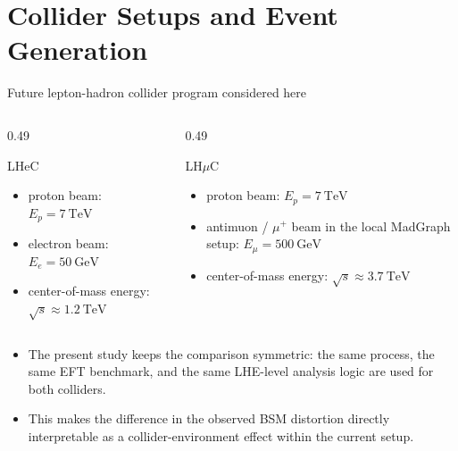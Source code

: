 \documentclass[aspectratio=1610,english]{beamer}
\begin{document}
\section{Collider Setups and Event Generation}



\begin{frame}{Future lepton-hadron collider program considered here}
\begin{columns}[T]
\begin{column}{0.49\textwidth}
\begin{block}{LHeC}
\begin{itemize}
 \justifying
    \item proton beam: \(E_p=7~\mathrm{TeV}\)
    \item electron beam: \(E_e=50~\mathrm{GeV}\)
    \item center-of-mass energy: \(\sqrt{s}\approx 1.2~\mathrm{TeV}\)
\end{itemize}
\end{block}
\end{column}
\begin{column}{0.49\textwidth}
\begin{block}{LH$\mu$C}
\begin{itemize}
 \justifying
    \item proton beam: \(E_p=7~\mathrm{TeV}\)
    \item antimuon / \(\mu^+\) beam in the local MadGraph setup: \(E_{\mu}=500~\mathrm{GeV}\)
    \item center-of-mass energy: \(\sqrt{s}\approx 3.7~\mathrm{TeV}\)
\end{itemize}
\end{block}
\end{column}
\end{columns}
\begin{itemize}
\justifying
\item The present study keeps the comparison symmetric: the same process, the same EFT benchmark, and the same LHE-level analysis logic are used for both colliders.
\item This makes the difference in the observed BSM distortion directly interpretable as a collider-environment effect within the current setup.
\end{itemize}
\end{frame}
\end{document}
